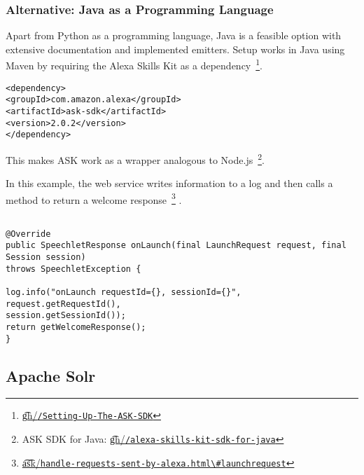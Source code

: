 \subsubsection*{Alternative: Java as a Programming Language }
Apart from Python as a programming language, Java is a feasible option with extensive documentation and implemented emitters.
Setup works in Java using Maven by requiring the Alexa Skills Kit as a dependency~\footnote{\href{https://github.com/alexa/alexa-skills-kit-sdk-for-java/wiki/Setting-Up-The-ASK-SDK}{\t{gh}/\lstinline|/Setting-Up-The-ASK-SDK|}}.

\begin{verbatim}
<dependency>
<groupId>com.amazon.alexa</groupId>
<artifactId>ask-sdk</artifactId>
<version>2.0.2</version>
</dependency>
\end{verbatim}

This makes ASK work as a wrapper analogous to Node.js~\footnote{ASK SDK for Java: %
\href{https://github.com/alexa/alexa-skills-kit-sdk-for-java}{\t{gh}/\lstinline|/alexa-skills-kit-sdk-for-java|}
}.


In this example, the web service writes information to a log and then calls a method to return a welcome response~\footnote{\href{https://developer.amazon.com/docs/custom-skills/handle-requests-sent-by-alexa.html\#launchrequest}{ \t{a\t{sk}}/\lstinline|handle-requests-sent-by-alexa.html\#launchrequest|}} \cite{alexaDesignGuide}.
\begin{verbatim}

@Override
public SpeechletResponse onLaunch(final LaunchRequest request, final Session session)
throws SpeechletException {

log.info("onLaunch requestId={}, sessionId={}", request.getRequestId(),
session.getSessionId());
return getWelcomeResponse();
}
\end{verbatim}






\subsection*{Apache Solr}
\label{Solr}


